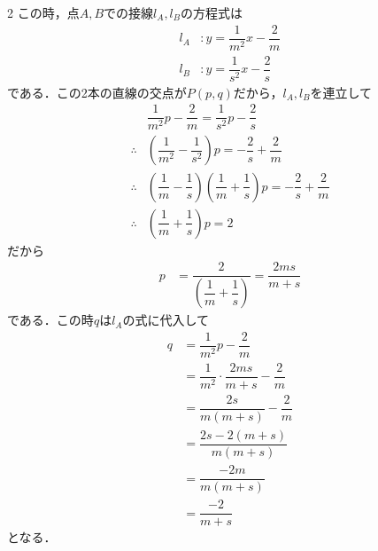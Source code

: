 \documentclass[../../main.tex]{subfiles}
\begin{document}
\begin{multicols}{2}
  この時，点$A,B$での接線$l_A,l_B$の方程式は
  \begin{align}
    l_A & : y = \dfrac{1}{m^2}x - \dfrac{2}{m} \\
    l_B & : y = \dfrac{1}{s^2}x - \dfrac{2}{s}
  \end{align}
  である．この2本の直線の交点が$P(p,q)$だから，$l_A, l_B$を連立して
  \begin{align}
    & \dfrac{1}{m^2}p - \dfrac{2}{m}                                               = \dfrac{1}{s^2}p - \dfrac{2}{s} \\
    \therefore
    & \left(\dfrac{1}{m^2}-\dfrac{1}{s^2}\right) p                                 = -\dfrac{2}{s} +  \dfrac{2}{m}  \\
    \therefore
    & \left(\dfrac{1}{m}-\dfrac{1}{s}\right)\left(\dfrac{1}{m}+\dfrac{1}{s}\right) p  = -\dfrac{2}{s} +  \dfrac{2}{m} \\
    \therefore
    & \left(\dfrac{1}{m}+\dfrac{1}{s}\right) p                                      = 2
  \end{align}
  だから
  \begin{align}
    p & = \dfrac{2}{\left(\dfrac{1}{m}+\dfrac{1}{s}\right)} = \dfrac{2ms}{m+s} \label{eq:1}
  \end{align}
  である．この時$q$は$l_A$の式に代入して
  \begin{align}
    q
    & = \dfrac{1}{m^2} p - \dfrac{2}{m}                     \nonumber   \\
    & = \dfrac{1}{m^2} \cdot \dfrac{2ms}{m+s} - \dfrac{2}{m} \nonumber   \\
    & = \dfrac{2s}{m(m+s)} - \dfrac{2}{m}                   \nonumber   \\
    & = \dfrac{2s - 2(m+s)}{m(m+s)}                        \nonumber   \\
    & = \dfrac{-2m}{m(m+s)}                                  \nonumber \\
    & = \dfrac{-2}{m+s} \label{eq:2}
  \end{align}
  となる．


\end{multicols}
\end{document}
